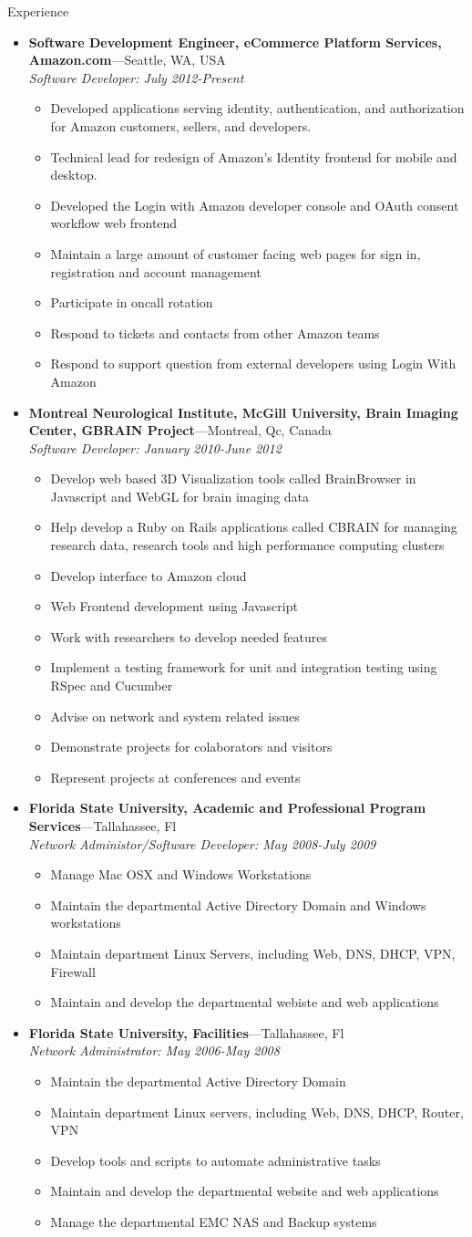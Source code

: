 \documentclass[11pt,oneside]{article}
\newenvironment{ressection}[1]{
  \vspace{4pt}
	 {\fontfamily{phv}\selectfont\Large#1}
	 \begin{itemize}
	   \vspace{3pt}
}{
	 \end{itemize}
}
\newcommand{\ressubitem}[1]{
  \vspace{-1pt}
\item \begin{flushleft} #1 \end{flushleft}
}
\newcommand{\resbigitem}[3]{
  \vspace{-5pt}
\item
  \textbf{#1}---#2 \\
  \textit{#3}
}
\newenvironment{ressubsec}[3]{
  \resbigitem{#1}{#2}{#3}
  \vspace{-2pt}
  \begin{itemize}
}{
  \end{itemize}
}
\begin{document}
\begin{ressection}{Experience}
  \begin{ressubsec}{Software Development Engineer, eCommerce Platform Services, Amazon.com}{Seattle, WA, USA}{Software Developer: July 2012-Present}  
    \ressubitem {Developed applications serving identity, authentication, and authorization for Amazon customers, sellers, and developers.}
    \ressubitem {Technical lead for redesign of Amazon's Identity frontend for mobile and desktop.}
    \ressubitem {Developed the Login with Amazon developer console and OAuth consent workflow web frontend}
    \ressubitem {Maintain a large amount of customer facing web pages for sign in, registration and account management}
    \ressubitem {Participate in oncall rotation}
    \ressubitem {Respond to tickets and contacts from other Amazon teams}
    \ressubitem {Respond to support question from external developers using Login With Amazon}
  \end{ressubsec}
  \begin{ressubsec}{Montreal Neurological Institute, McGill University, Brain Imaging Center, GBRAIN Project}{Montreal, Qc, Canada}{Software Developer: January 2010-June 2012}
    \ressubitem {Develop web based 3D Visualization tools called BrainBrowser in Javascript and WebGL for brain imaging data}
    \ressubitem {Help develop a  Ruby on Rails applications called CBRAIN for managing research data, research tools and high performance computing clusters}
    \ressubitem {Develop interface to Amazon cloud}
    \ressubitem {Web Frontend development using Javascript} 
    \ressubitem {Work with researchers to develop needed features}
    \ressubitem {Implement a testing framework for unit and integration testing using RSpec and Cucumber}
    \ressubitem {Advise on network and system related issues}
    \ressubitem {Demonstrate projects for colaborators and visitors}
    \ressubitem {Represent projects at conferences and events}
  \end{ressubsec}
  \begin{ressubsec}{Florida State University, Academic and Professional Program Services}{Tallahassee, Fl}{Network Administor/Software Developer: May 2008-July 2009}
    \ressubitem{Manage Mac OSX and Windows Workstations}
    \ressubitem{Maintain the departmental Active Directory Domain and Windows workstations}
    \ressubitem{Maintain department Linux Servers, including Web, DNS, DHCP, VPN, Firewall}
    \ressubitem{Maintain and develop the departmental webiste and web applications}
  \end{ressubsec}
  \begin{ressubsec}{Florida State University, Facilities}{Tallahassee, Fl}
    {Network Administrator: May 2006-May 2008}
    \ressubitem{Maintain the departmental Active Directory Domain}
    \ressubitem{Maintain department Linux servers, including Web, DNS, DHCP, Router, VPN}
    \ressubitem{Develop tools and scripts to automate administrative tasks}
    \ressubitem{Maintain and develop the departmental website and web applications}
    \ressubitem{Manage the departmental EMC NAS and Backup systems}
  \end{ressubsec}
\end{ressection}
\end{document}
